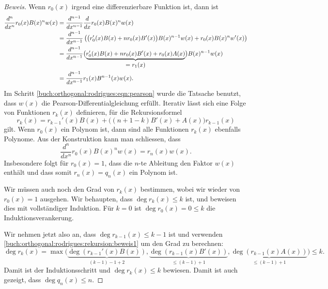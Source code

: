 \begin{proof}[Beweis]
Wenn $r_0(x)$ irgend eine differenzierbare Funktion ist, dann ist
\begin{align}
\frac{d^n}{dx^n}
r_0(x) B(x)^n w(x)
&=
\frac{d^{n-1}}{dx^{n-1}}\frac{d}{dx} r_0(x) B(x)^n w(x)
\notag
\\
&=
\frac{d^{n-1}}{dx^{n-1}}
\left(
\bigl(r_0'(x)B(x)+ nr_0(x)B'(x) \bigr) B(x)^{n-1}w(x) + r_0(x)B(x)^n w'(x)
\right)
\notag
\\
&=
\frac{d^{n-1}}{dx^{n-1}}
\bigl(
\underbrace{r_0'(x)B(x)+nr_0(x)B'(x)+r_0(x)A(x)}_{\displaystyle = r_1(x)}
\bigr)
B(x)^{n-1} w(x)
\label{buch:orthogonal:rodrigues:eqn:pearson}
\\
&=
\frac{d^{n-1}}{dx^{n-1}} r_1(x)B^{n-1}(x) w(x).
\end{align}
Im Schritt
\eqref{buch:orthogonal:rodrigues:eqn:pearson}
wurde die Tatsache benutzt, dass $w(x)$ die Pearson-Differentialgleichung
erfüllt.
Iterativ lässt sich eine Folge von
Funktionen $r_k(x)$ definieren, für die Rekursionsformel
\begin{equation}
r_k(x) = r_{k-1}'(x)B(x) + \bigl((n+1-k)B'(x) + A(x)\bigr)r_{k-1}(x)
\label{buch:orthogonal:rodrigues:rekursion:beweis1}
\end{equation}
gilt.
Wenn $r_0(x)$ ein Polynom ist, dann sind alle Funktionen $r_k(x)$
ebenfalls Polynome.
Aus der Konstruktion kann man schliessen, dass
\[
\frac{d^n}{dx^n} r_0(x) B(x)^n w(x)
=
r_n(x) w(x).
\]
Insbesondere folgt für $r_0(x)=1$, dass die $n$-te Ableitung den
Faktor $w(x)$ enthält und dass somit $r_n(x)=q_n(x)$ ein Polynom ist.

Wir müssen auch noch den Grad von $r_k(x)$ bestimmen, wobei wir
wieder von $r_0(x)=1$ ausgehen.
Wir behaupten, dass $\deg r_k(x)\le k$ ist, und beweisen dies
mit vollständiger Induktion.
Für $k=0$ ist $\deg r_0(x) = 0 \le k$ die Induktionsverankerung.

Wir nehmen jetzt also an, dass $\deg r_{k-1}(x)\le k-1$ ist und
verwenden 
\eqref{buch:orthogonal:rodrigues:rekursion:beweis1} um den Grad zu berechnen:
\begin{equation*}
\deg r_k(x)
=
\max \bigl(
\underbrace{\deg(r_{k-1}'(x) B(x))}_{\displaystyle (k-1) -1 + 2}
,
\underbrace{\deg(r_{k-1}(x)B'(x))}_{\displaystyle \le (k-1)+1}
,
\underbrace{\deg(r_{k-1}(x)A(x))}_{\displaystyle \le (k-1)+1}
\bigr)
\le k.
\end{equation*}
Damit ist der Induktionsschritt und $\deg r_k(x)\le k$ bewiesen.
Damit ist auch gezeigt, dass $\deg q_n(x)\le n$.
\end{proof}

